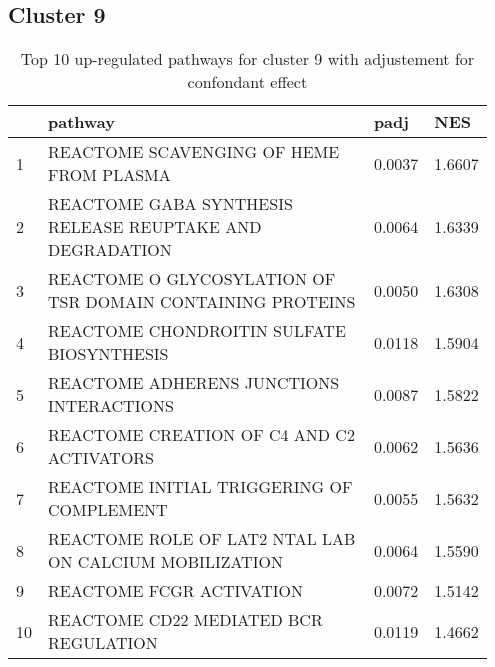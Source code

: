 \documentclass{article}
\begin{document}
\subsection{Cluster 9 }
\begin{table}[H]
\centering
\begin{tabular}{p{0.05\linewidth}p{0.7\linewidth}p{0.1\linewidth}p{0.1\linewidth}}
  \hline
 & pathway & padj & NES \\ 
  \hline
1 & REACTOME SCAVENGING OF HEME FROM PLASMA & 0.0037 & 1.6607 \\ 
  2 & REACTOME GABA SYNTHESIS RELEASE REUPTAKE AND DEGRADATION & 0.0064 & 1.6339 \\ 
  3 & REACTOME O GLYCOSYLATION OF TSR DOMAIN CONTAINING PROTEINS & 0.0050 & 1.6308 \\ 
  4 & REACTOME CHONDROITIN SULFATE BIOSYNTHESIS & 0.0118 & 1.5904 \\ 
  5 & REACTOME ADHERENS JUNCTIONS INTERACTIONS & 0.0087 & 1.5822 \\ 
  6 & REACTOME CREATION OF C4 AND C2 ACTIVATORS & 0.0062 & 1.5636 \\ 
  7 & REACTOME INITIAL TRIGGERING OF COMPLEMENT & 0.0055 & 1.5632 \\ 
  8 & REACTOME ROLE OF LAT2 NTAL LAB ON CALCIUM MOBILIZATION & 0.0064 & 1.5590 \\ 
  9 & REACTOME FCGR ACTIVATION & 0.0072 & 1.5142 \\ 
  10 & REACTOME CD22 MEDIATED BCR REGULATION & 0.0119 & 1.4662 \\ 
   \hline
\end{tabular}
\caption{Top 10 up-regulated pathways for cluster 9 with adjustement for confondant effect} 
\label{tab:q3_2_conf_9}
\end{table}
\end{document}
